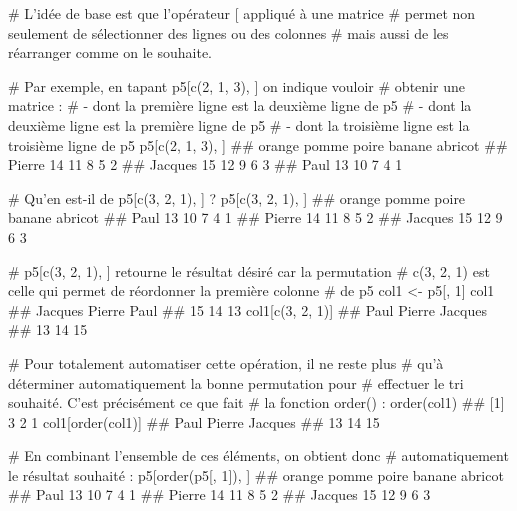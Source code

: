 \documentclass[12pt,twosided, notitlepage]{book}
\newenvironment{Shaded}{}{}
\newcommand{\KeywordTok}[1]{\textcolor[rgb]{0.00,0.00,1.00}{#1}}
\newcommand{\DecValTok}[1]{#1}
\newcommand{\StringTok}[1]{\textcolor[rgb]{0.00,0.50,0.50}{#1}}
\newcommand{\CommentTok}[1]{\textcolor[rgb]{0.00,0.50,0.00}{#1}}
\newcommand{\NormalTok}[1]{#1}
\renewenvironment{Shaded}{\begin{snugshade}}{\end{snugshade}}
\begin{document}
\begin{enumerate}
\begin{Shaded}
\begin{Highlighting}[]
\CommentTok{# L'idée de base est que l'opérateur [ appliqué à une matrice}
\CommentTok{# permet non seulement de sélectionner des lignes ou des colonnes}
\CommentTok{# mais aussi de les réarranger comme on le souhaite.}

\CommentTok{# Par exemple, en tapant p5[c(2, 1, 3), ] on indique vouloir}
\CommentTok{# obtenir une matrice : }
\CommentTok{# - dont la première ligne est la deuxième ligne de p5}
\CommentTok{# - dont la deuxième ligne est la première ligne de p5}
\CommentTok{# - dont la troisième ligne est la troisième ligne de p5}
\NormalTok{p5[}\KeywordTok{c}\NormalTok{(}\DecValTok{2}\NormalTok{, }\DecValTok{1}\NormalTok{, }\DecValTok{3}\NormalTok{), ]}
\NormalTok{  ##         orange pomme poire banane abricot}
\NormalTok{  ## Pierre      14    11     8      5       2}
\NormalTok{  ## Jacques     15    12     9      6       3}
\NormalTok{  ## Paul        13    10     7      4       1}

\CommentTok{# Qu'en est-il de p5[c(3, 2, 1), ] ? }
\NormalTok{p5[}\KeywordTok{c}\NormalTok{(}\DecValTok{3}\NormalTok{, }\DecValTok{2}\NormalTok{, }\DecValTok{1}\NormalTok{), ]}
\NormalTok{  ##         orange pomme poire banane abricot}
\NormalTok{  ## Paul        13    10     7      4       1}
\NormalTok{  ## Pierre      14    11     8      5       2}
\NormalTok{  ## Jacques     15    12     9      6       3}

\CommentTok{# p5[c(3, 2, 1), ] retourne le résultat désiré car la permutation}
\CommentTok{# c(3, 2, 1) est celle qui permet de réordonner la première colonne}
\CommentTok{# de p5}
\NormalTok{col1 <-}\StringTok{ }\NormalTok{p5[, }\DecValTok{1}\NormalTok{]}
\NormalTok{col1}
\NormalTok{  ## Jacques  Pierre    Paul }
\NormalTok{  ##      15      14      13}
\NormalTok{col1[}\KeywordTok{c}\NormalTok{(}\DecValTok{3}\NormalTok{, }\DecValTok{2}\NormalTok{, }\DecValTok{1}\NormalTok{)]}
\NormalTok{  ##    Paul  Pierre Jacques }
\NormalTok{  ##      13      14      15}

\CommentTok{# Pour totalement automatiser cette opération, il ne reste plus}
\CommentTok{# qu'à déterminer automatiquement la bonne permutation pour }
\CommentTok{# effectuer le tri souhaité. C'est précisément ce que fait}
\CommentTok{# la fonction order() : }
\KeywordTok{order}\NormalTok{(col1)}
\NormalTok{  ## [1] 3 2 1}
\NormalTok{col1[}\KeywordTok{order}\NormalTok{(col1)]}
\NormalTok{  ##    Paul  Pierre Jacques }
\NormalTok{  ##      13      14      15}

\CommentTok{# En combinant l'ensemble de ces éléments, on obtient donc}
\CommentTok{# automatiquement le résultat souhaité : }
\NormalTok{p5[}\KeywordTok{order}\NormalTok{(p5[, }\DecValTok{1}\NormalTok{]), ]}
\NormalTok{  ##         orange pomme poire banane abricot}
\NormalTok{  ## Paul        13    10     7      4       1}
\NormalTok{  ## Pierre      14    11     8      5       2}
\NormalTok{  ## Jacques     15    12     9      6       3}
\end{Highlighting}
\end{Shaded}


\end{enumerate}
\end{document}
